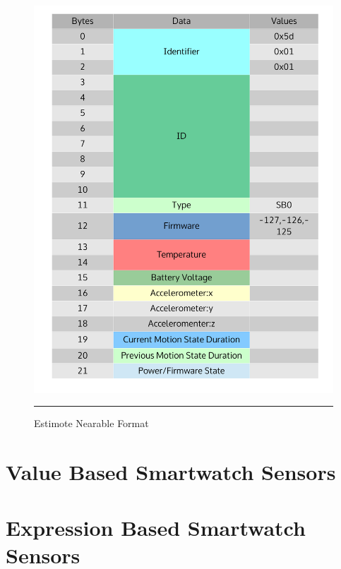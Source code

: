 \begin{figure}[htbp]
  \centering
    \includegraphics[scale=0.4]{Figures/data_format.pdf}
    \rule{35em}{0.5pt}
  \caption[Estimote Nearable Format]{Estimote Nearable Format}
  \label{fig:estimote_format}
\end{figure}

\section{ Value Based Smartwatch Sensors }

\section{Expression  Based  Smartwatch Sensors }

